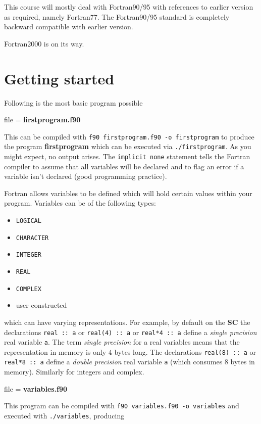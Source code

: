 \documentclass[12pt,a4paper,oneside,openany]{report}
\newcommand{\fcode}[1]{\par file = \textbf{#1} }
\newcommand{\code}[1]{\texttt{#1}}
\newcommand{\SC}{\textbf{SC} }
\begin{document}
This course will mostly deal with Fortran90/95 with references to earlier version as required, namely Fortran77.  The Fortran90/95 standard is completely backward compatible with earlier version.

Fortran2000 is on its way.

\newpage

\section*{Getting started}

Following is the most basic program possible
\fcode{firstprogram.f90}

This can be compiled with \code{f90 firstprogram.f90 -o firstprogram} to produce the program \textbf{firstprogram} which can be executed via \code{./firstprogram}.  As you might expect, no output arises.  The \code{implicit none} statement tells the Fortran compiler to assume that all variables will be declared and to flag an error if a variable isn't declared (good programming practice).

Fortran allows variables to be defined which will hold certain values within your program.  Variables can be of the following types:
\begin{itemize}
\item \code{LOGICAL}
\item \code{CHARACTER}
\item \code{INTEGER}
\item \code{REAL}
\item \code{COMPLEX}
\item user constructed
\end{itemize}
which can have varying representations.  For example, by default on the \SC the declarations \code{real :: a} or \code{real(4) :: a} or \code{real*4 :: a} define a \textit{single precision} real variable \code{a}.  The term \textit{single precision} for a real variables means that the representation in memory is only $4$ bytes long.  The declarations \code{real(8) :: a} or \code{real*8 :: a} define a \textit{double precision} real variable \code{a} (which consumes $8$ bytes in memory).  Similarly for integers and complex.

\newpage

\fcode{variables.f90}

This program can be compiled with \code{f90 variables.f90 -o variables} and executed with \code{./variables}, producing

\newpage
\end{document}
